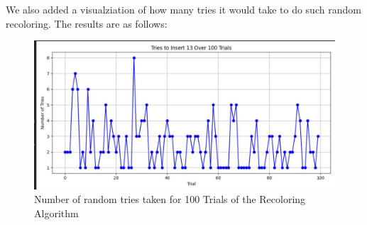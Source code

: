 \documentclass[12pt]{article}
\begin{document}
We also added a visualziation of how many tries it would take to do such random recoloring. The results are as follows:

\begin{figure}
    \centering
    \includegraphics[width=\textwidth]{trials.jpeg}
    \caption{Number of random tries taken for 100 Trials of the Recoloring Algorithm}
    \label{fig:recoloring}
\end{figure}
\end{document}
